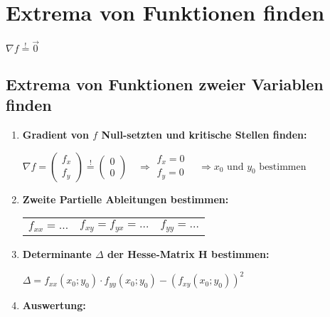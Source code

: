 \section{Extrema von Funktionen finden} \label{section:extrema_bivar}
 $\nabla f \stackrel{!}{=} \vec{0}$

\subsection{Extrema von Funktionen zweier Variablen finden}
\begin{enumerate}[itemsep=1ex]
    \item \textbf{Gradient von $f$ Null-setzten und kritische Stellen finden:}

    $\nabla f=
    \begin{pmatrix}
        f_x\\
        f_y
    \end{pmatrix} \stackrel{!}{=}
    \begin{pmatrix}
        0\\
        0
    \end{pmatrix}
    \, \, \, \, \, \,
    \Rightarrow 
    \begin{matrix}
        f_{x}=0\\
        f_{y}=0
    \end{matrix}
    \, \, \, \, \, \,
    \Rightarrow
    x_0 \text{ und } y_0 \text{ bestimmen}$

    \item \textbf{Zweite Partielle Ableitungen bestimmen:}
        
    \begin{tabular}{lll}
        $f_{xx} = \dots$ & $f_{xy} = f_{yx} = \dots$ & $f_{yy} = \dots$ \\
    \end{tabular}

    \item \textbf{Determinante $\Delta$ der Hesse-Matrix H bestimmen:}
    
    $\Delta = f_{xx}(x_0;y_0) \cdot f_{yy}(x_0;y_0) - \left(f_{xy}(x_0;y_0)\right)^2 $

    \item \textbf{Auswertung:}
    

\end{enumerate}
